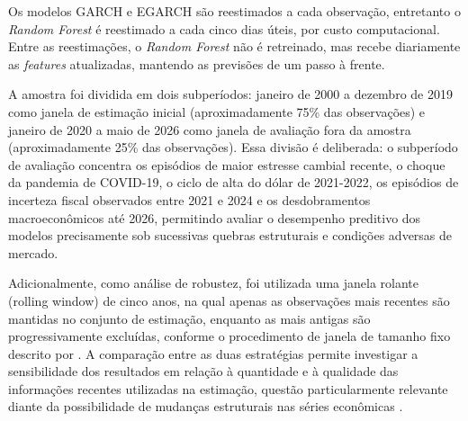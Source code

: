 Os modelos GARCH e EGARCH são reestimados a cada observação, entretanto o \textit{Random Forest} é reestimado a cada cinco dias úteis, por custo computacional. Entre as reestimações, o \textit{Random Forest}
não é retreinado, mas recebe diariamente as \textit{features} atualizadas, mantendo as previsões de um passo à frente.

A amostra foi dividida em dois subperíodos: janeiro de 2000 a dezembro de 2019 como janela de estimação inicial (aproximadamente 75\% das observações) e janeiro de 2020 a maio de 2026 
como janela de avaliação fora da amostra (aproximadamente 25\% das observações). Essa divisão é deliberada: o subperíodo de avaliação concentra os episódios de maior estresse cambial recente, 
o choque da pandemia de COVID-19, o ciclo de alta do dólar de 2021-2022, os episódios de incerteza fiscal observados entre 2021 e 2024 e os desdobramentos macroeconômicos até 2026, permitindo avaliar o desempenho preditivo 
dos modelos precisamente sob sucessivas quebras estruturais e condições adversas de mercado.

Adicionalmente, como análise de robustez, foi utilizada uma janela rolante (rolling window) de cinco anos, na qual apenas as observações mais recentes são mantidas no conjunto de estimação, 
enquanto as mais antigas são progressivamente excluídas, conforme o procedimento de janela de tamanho fixo descrito por \textcite{tashman2000out}. A comparação entre as duas estratégias permite investigar 
a sensibilidade dos resultados em relação à quantidade e à qualidade das informações recentes utilizadas na estimação, questão particularmente relevante diante da possibilidade de mudanças estruturais nas séries econômicas \cite{pesaran2007selection}.

